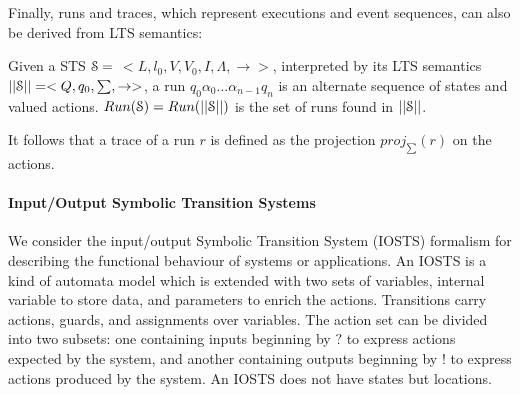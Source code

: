 Finally, runs and traces, which represent executions and event
sequences, can also be derived from LTS semantics:

\begin{definition}
    Given a STS $\EuScript{S}=$ $<L,l_0,V,V_0,I,\Lambda,
	\rightarrow>$, interpreted by its LTS semantics
	$||\EuScript{S}||=<Q,q_0,\sum,\rightarrow>$, a run $q_0
	\alpha_0 \dots \alpha_{n-1} q_n$ is an alternate sequence of states
    and valued actions. $Run(\EuScript{S})=Run(||\EuScript{S}||)$ is
	the set of runs found in $||\EuScript{S}||$.

    It follows that a trace of a run $r$ is defined as the projection
    $proj_{\sum}(r)$ on the actions.

	\label{def:runs-and-traces}
\end{definition}

\paragraph{Input/Output Symbolic Transition Systems}
\label{sec:definitions:iosts}

We consider the input/output Symbolic Transition System (IOSTS)
formalism \cite{FTW05} for describing the functional behaviour of
systems or applications. An IOSTS is a kind of automata model
which is extended with two sets of variables, internal variable
to store data, and parameters to enrich the actions. Transitions
carry actions, guards, and assignments over variables. The action
set can be divided into two subsets: one containing inputs
beginning by $?$ to express actions expected by the system, and
another containing outputs beginning by $!$ to express actions
produced by the system. An IOSTS does not have states but
locations.

